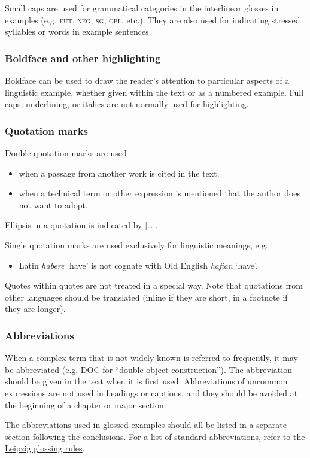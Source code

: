 \documentclass[charis,linguex,biblatex]{glossa}
\begin{document}
Small caps are used for grammatical categories in the interlinear glosses in examples (e.g. \textsc{fut, neg, sg, obl}, etc.). They are also used for indicating stressed syllables or words in example sentences. 

\subsubsection{Boldface and other highlighting}
Boldface can be used to draw the reader’s attention to particular aspects of a linguistic example, whether given within the text or as a numbered example. Full caps, underlining, or italics are not normally used for highlighting.

\subsubsection{Quotation marks}
Double quotation marks are used

\begin{itemize}
\item when a passage from another work is cited in the text.
\item when a technical term or other expression is mentioned that the author does not want to adopt.
\end{itemize}
Ellipsis in a quotation is indicated by [\ldots].

Single quotation marks are used exclusively for linguistic meanings, e.g.
\begin{itemize}
\item Latin \textit{habere} ‘have’ is not cognate with Old English \textit{hafian} ‘have’.
\end{itemize}
Quotes within quotes are not treated in a special way.
Note that quotations from other languages should be translated (inline if they are short, in a footnote if they are longer).

\subsubsection{Abbreviations}
When a complex term that is not widely known is referred to frequently, it may be abbreviated (e.g. DOC for ``double-object construction''). The abbreviation should be given in the text when it is first used. Abbreviations of uncommon expressions are not used in headings or captions, and they should be avoided at the beginning of a chapter or major section.

The abbreviations used in glossed examples should all be listed in a separate section following the conclusions. For a list of standard abbreviations, refer to the \href{https://www.eva.mpg.de/lingua/resources/glossing-rules.php}{Leipzig glossing rules}. 
\end{document}
